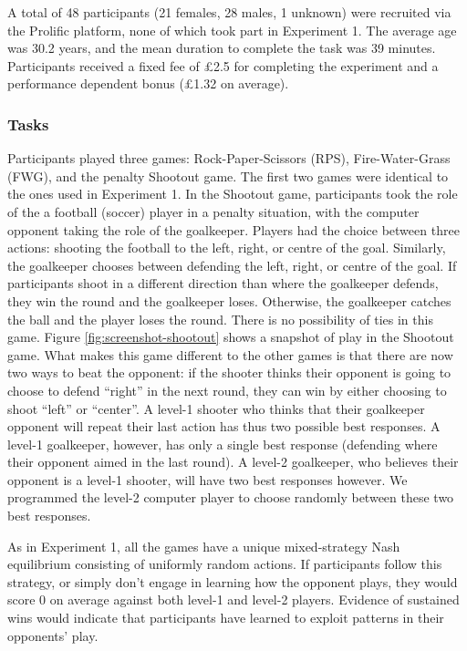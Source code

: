 \documentclass[smallextended]{svjour3}       %
\begin{document}
A total of 48 participants (21 females, 28 males, 1 unknown) were
recruited via the Prolific platform, none of which took part in
Experiment 1. The average age was 30.2 years, and the mean duration to
complete the task was 39 minutes. Participants received a fixed fee of
£2.5 for completing the experiment and a performance dependent bonus
(£1.32 on average).

\hypertarget{tasks-1}{%
\subsubsection{Tasks}\label{tasks-1}}

Participants played three games: Rock-Paper-Scissors (RPS),
Fire-Water-Grass (FWG), and the penalty Shootout game. The first two
games were identical to the ones used in Experiment 1. In the Shootout
game, participants took the role of the a football (soccer) player in a
penalty situation, with the computer opponent taking the role of the
goalkeeper. Players had the choice between three actions: shooting the
football to the left, right, or centre of the goal. Similarly, the
goalkeeper chooses between defending the left, right, or centre of the
goal. If participants shoot in a different direction than where the
goalkeeper defends, they win the round and the goalkeeper loses.
Otherwise, the goalkeeper catches the ball and the player loses the
round. There is no possibility of ties in this game. Figure
\ref{fig:screenshot-shootout} shows a snapshot of play in the Shootout
game. What makes this game different to the other games is that there
are now two ways to beat the opponent: if the shooter thinks their
opponent is going to choose to defend ``right'' in the next round, they
can win by either choosing to shoot ``left'' or ``center''. A level-1
shooter who thinks that their goalkeeper opponent will repeat their last
action has thus two possible best responses. A level-1 goalkeeper,
however, has only a single best response (defending where their opponent
aimed in the last round). A level-2 goalkeeper, who believes their
opponent is a level-1 shooter, will have two best responses however. We
programmed the level-2 computer player to choose randomly between these
two best responses.

As in Experiment 1, all the games have a unique mixed-strategy Nash
equilibrium consisting of uniformly random actions. If participants
follow this strategy, or simply don't engage in learning how the
opponent plays, they would score 0 on average against both level-1 and
level-2 players. Evidence of sustained wins would indicate that
participants have learned to exploit patterns in their opponents' play.
\end{document}
